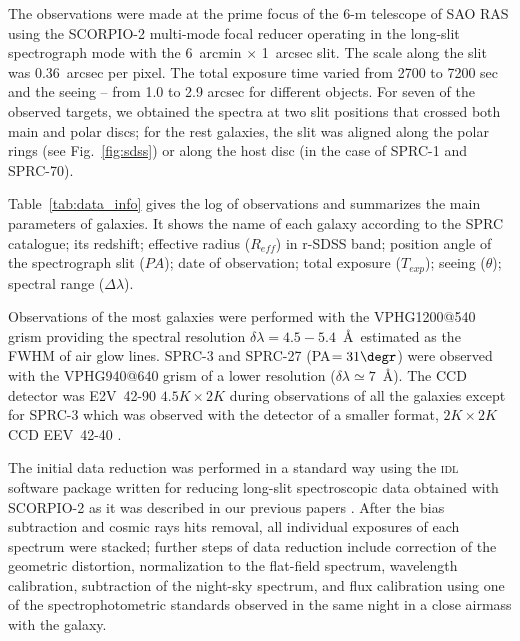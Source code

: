 \documentclass[useAMS,usenatbib]{mnras}
\begin{document}
 
The observations  were made at the prime focus of the 6-m telescope of SAO RAS using the \mbox{SCORPIO-2} multi-mode focal reducer \citep{scorpio2} operating in the long-slit spectrograph mode with the 6~arcmin $\times$ 1~arcsec slit. The scale along the slit was 0.36~arcsec
per pixel. The total exposure time varied from 2700 to 7200 sec and the seeing -- from 1.0 to 2.9 arcsec for different objects. For seven of the observed targets, we obtained the spectra at two slit positions that crossed both main and polar discs; for the rest galaxies, the slit was aligned along the polar rings (see Fig.~\ref{fig:sdss}) or along the host disc (in the case of SPRC-1 and SPRC-70).

Table~\ref{tab:data_info} gives the log of observations and summarizes  the main parameters of galaxies. It shows the name of each galaxy according to the SPRC catalogue; its redshift; effective radius ($R_{eff}$) in r-SDSS band; position angle of the spectrograph slit ($PA$); date of observation; total exposure ($T_{exp}$);  seeing ($\theta$); spectral range ($\Delta\lambda$). %

Observations of the most galaxies were performed with the VPHG1200@540 grism providing the spectral resolution $\delta\lambda = 4.5-5.4$~\AA\, estimated as the FWHM of air glow lines. SPRC-3 and SPRC-27 (PA$=31\degr$) were observed with   the VPHG940@640 grism of a lower resolution ($\delta\lambda \simeq 7$~\AA).  The CCD detector  was \hbox{E2V 42-90} $4.5K\times 2K$ during observations of all the galaxies except for  SPRC-3 which was observed with the detector of a smaller format, $2K\times 2K$ CCD \hbox{EEV 42-40} .

The initial data reduction was performed in a standard way using the \textsc{idl} software package written for reducing long-slit spectroscopic data obtained with \mbox{SCORPIO-2} as it was described in our previous papers \citep[e.g.,][]{Egorov2018}. After the bias subtraction and cosmic rays hits removal, all individual exposures of each spectrum were stacked; further steps of data reduction include  correction of the geometric distortion, normalization to the flat-field spectrum, wavelength calibration, subtraction of the night-sky spectrum, and flux calibration using one of the spectrophotometric standards observed in the same night in a  close airmass with the galaxy. 
\end{document}

